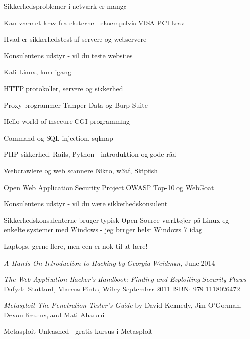 \documentclass[20pt,landscape,a4paper,footrule]{foils}
\begin{document}


\begin{list1}
\item Sikkerhedsproblemer i netværk er mange
\item Kan være et krav fra eksterne - eksempelvis VISA PCI krav
\end{list1}



\begin{list2}
\item Hvad er sikkerhedstest af servere og webservere
\item Konsulentens udstyr - vil du teste websites
\item Kali Linux, kom igang
\item HTTP protokoller, servere og sikkerhed
\item Proxy programmer Tamper Data og Burp Suite
\item Hello world of insecure CGI programming
\item Command og SQL injection, sqlmap
\item PHP sikkerhed, Rails, Python - introduktion og gode råd
\item Webcrawlere og web scannere Nikto, w3af, Skipfish
\item Open Web Application Security Project OWASP Top-10 og WebGoat
\end{list2}


\centerline{Konsulentens udstyr - vil du være sikkerhedskonsulent}

\begin{list1}
\item Sikkerhedskonsulenterne bruger typisk Open Source værktøjer på Linux og
enkelte systemer med Windows - jeg bruger helst Windows 7 idag
\item Laptops, gerne flere, men een er nok til at lære!
\begin{list2}
\item \emph{A Hands-On Introduction to Hacking
by Georgia Weidman}, June 2014\\
\item \emph{The Web Application Hacker's Handbook: Finding and Exploiting Security Flaws}
Dafydd Stuttard, Marcus Pinto, Wiley September 2011 ISBN: 978-1118026472
\item \emph{Metasploit The Penetration Tester's Guide}
by David Kennedy, Jim O'Gorman, Devon Kearns, and Mati Aharoni\\
\item Metasploit Unleashed - gratis kursus i Metasploit\\
\end{list2}
\end{list1}
\end{document}

